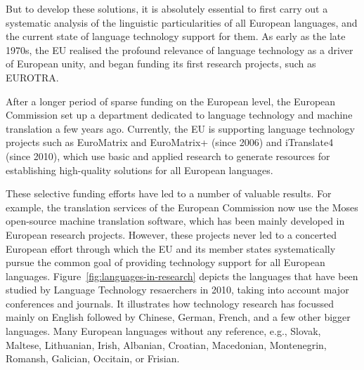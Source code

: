 \documentclass[10pt, plain]{../../metanetpaper}
\begin{document}
\begin{multicols}{2}
But to develop these solutions, it is absolutely essential to first carry out a systematic analysis of the linguistic particularities of all European languages, and the current state of language technology support for them. As early as the late 1970s, the EU realised the profound relevance of language technology as a driver of European unity, and began funding its first research projects, such as EUROTRA.

After a longer period of sparse funding on the European level, the European Commission set up a department dedicated to language technology and machine translation a few years ago. Currently, the EU is supporting language technology projects such as EuroMatrix and EuroMatrix+ (since 2006) and iTranslate4 (since 2010), which use basic and applied research to generate resources for establishing high-quality solutions for all European languages.

These selective funding efforts have led to a number of valuable results. For example, the translation services of the European Commission now use the Moses open-source machine translation software, which has been mainly developed in European research projects. However, these projects never led to a concerted European effort through which the EU and its member states systematically pursue the common goal of providing technology support for all European languages. Figure~\ref{fig:languages-in-research} depicts the languages that have been studied by Language Technology resaerchers in 2010, taking into account major conferences and journals. It illustrates how technology research has focussed mainly on English followed by Chinese, German, French, and a few other bigger languages. Many European languages without any reference, e.g., Slovak, Maltese, Lithuanian, Irish, Albanian, Croatian, Macedonian, Montenegrin, Romansh, Galician, Occitain, or Frisian.


\end{multicols}
\end{document}
